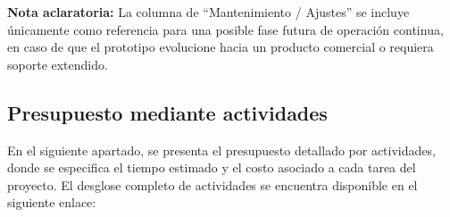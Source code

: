 \begin{table}[H]
	\centering
	\renewcommand{\arraystretch}{1.5}
	\setlength{\tabcolsep}{10pt}
	\caption{Costos estimados de sueldos y asesorías en un entorno comercial durante el creación del prototipo.}
	\label{tab:sueldos_comercial}
\end{table}


\noindent \textbf{Nota aclaratoria:}  
La columna de “Mantenimiento / Ajustes” se incluye únicamente como referencia para una posible fase futura de operación continua, en caso de que el prototipo evolucione hacia un producto comercial o requiera soporte extendido. 


\subsection{Presupuesto mediante actividades}

En el siguiente apartado, se presenta el presupuesto detallado por actividades, donde se especifica el tiempo estimado y el costo asociado a cada tarea del proyecto.
El desglose completo de actividades se encuentra disponible en el siguiente enlace:

